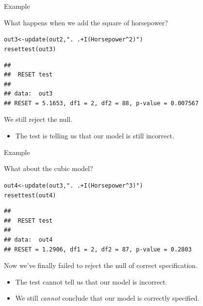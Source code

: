 \documentclass{beamer}\usepackage[]{graphicx}\usepackage[]{color}
\makeatletter
\newcommand{\hlstr}[1]{\textcolor[rgb]{0.749,0.012,0.012}{#1}}%
\newcommand{\hlstd}[1]{\textcolor[rgb]{0,0,0}{#1}}%
\newcommand{\hlkwb}[1]{\textcolor[rgb]{0,0.341,0.682}{#1}}%
\newcommand{\hlkwd}[1]{\textcolor[rgb]{0.004,0.004,0.506}{#1}}%
\newenvironment{kframe}{%
 \def\at@end@of@kframe{}%
 \ifinner\ifhmode%
  \def\at@end@of@kframe{\end{minipage}}%
  \begin{minipage}{\columnwidth}%
 \fi\fi%
 \def\FrameCommand##1{\hskip\@totalleftmargin \hskip-\fboxsep
 \colorbox{shadecolor}{##1}\hskip-\fboxsep
     \hskip-\linewidth \hskip-\@totalleftmargin \hskip\columnwidth}%
 \MakeFramed {\advance\hsize-\width
   \@totalleftmargin\z@ \linewidth\hsize
   \@setminipage}}%
 {\par\unskip\endMakeFramed%
 \at@end@of@kframe}
\newenvironment{knitrout}{}{} %
\makeatother
\begin{document}

\begin{frame}[fragile]{Example}

  What happens when we add the square of horsepower?
  
\begin{knitrout}\footnotesize
{}\color{fgcolor}\begin{kframe}
\begin{alltt}
\hlstd{out3} \hlkwb{<-} \hlkwd{update}\hlstd{(out2,} \hlstr{". ~ . + I(Horsepower^2)"}\hlstd{)}
\hlkwd{resettest}\hlstd{(out3)}
\end{alltt}
\begin{verbatim}
## 
## 	RESET test
## 
## data:  out3
## RESET = 5.1653, df1 = 2, df2 = 88, p-value = 0.007567
\end{verbatim}
\end{kframe}
\end{knitrout}

We still reject the null.
\begin{itemize}
\item The test is telling us that our model is still incorrect.
\end{itemize}

\end{frame}


\begin{frame}[fragile]{Example}

  What about the cubic model?
  
\begin{knitrout}\footnotesize
{}\color{fgcolor}\begin{kframe}
\begin{alltt}
\hlstd{out4} \hlkwb{<-} \hlkwd{update}\hlstd{(out3,} \hlstr{". ~ . + I(Horsepower^3)"}\hlstd{)}
\hlkwd{resettest}\hlstd{(out4)}
\end{alltt}
\begin{verbatim}
## 
## 	RESET test
## 
## data:  out4
## RESET = 1.2906, df1 = 2, df2 = 87, p-value = 0.2803
\end{verbatim}
\end{kframe}
\end{knitrout}

Now we've finally failed to reject the null of correct specification.
\begin{itemize}
\item The test cannot tell us that our model is incorrect.
\item We still \emph{cannot} conclude that our model is correctly specified.
\end{itemize}

\end{frame}
\end{document}
